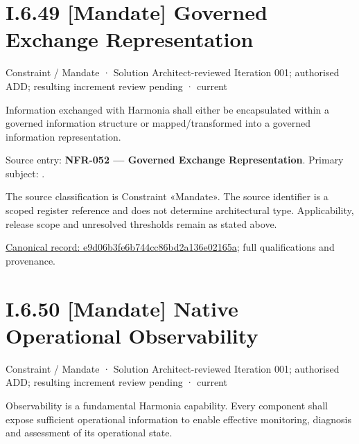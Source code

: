 \section*{I.6.49 [Mandate] Governed Exchange Representation}
\label{navigation:I.6.49}

\label{element:e9d06b3fe6b744cc86bd2a136e02165a}
{\small Constraint / Mandate · Solution Architect-reviewed Iteration 001; authorised ADD; resulting increment review pending · current}\par

Information exchanged with Harmonia shall either be encapsulated within a governed information structure or mapped/transformed into a governed information representation.



Source entry: \textbf{NFR-052 — Governed Exchange Representation}. Primary subject: \texttt{}.



The source classification is Constraint «Mandate». The source identifier is a scoped register reference and does not determine architectural type. Applicability, release scope and unresolved thresholds remain as stated above.


{\footnotesize \href{../../../../continuum/motivation/constraint/mandate/e9d06b3fe6b744cc86bd2a136e02165a.md}{Canonical record: e9d06b3fe6b744cc86bd2a136e02165a}; full qualifications and provenance.}\par
\section*{I.6.50 [Mandate] Native Operational Observability}
\label{navigation:I.6.50}

\label{element:151906f8acad4519b7f9204cce9fc758}
{\small Constraint / Mandate · Solution Architect-reviewed Iteration 001; authorised ADD; resulting increment review pending · current}\par

Observability is a fundamental Harmonia capability. Every component shall expose sufficient operational information to enable effective monitoring, diagnosis and assessment of its operational state.



